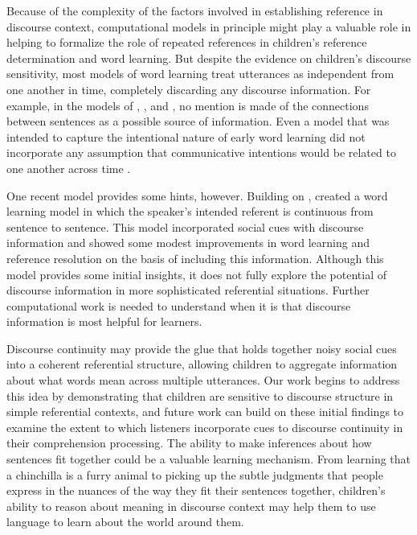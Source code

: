 \documentclass[man]{apa2}
\begin{document}
Because of the complexity of the factors involved in establishing reference in discourse context, computational models in principle might play a valuable role in helping to formalize the role of repeated references in children's reference determination and word learning. But despite the evidence on children's discourse sensitivity, most models of word learning treat utterances as independent from one another in time, completely discarding any discourse information. For example, in the models of , , and , no mention is made of the connections between sentences as a possible source of information. Even a model that was intended to capture the intentional nature of early word learning did not incorporate any assumption that communicative intentions would be related to one another across time \cite{frank2009}. 

One recent model provides some hints, however. Building on ,  created a word learning model in which the speaker's intended referent is continuous from sentence to sentence. This model incorporated social cues with discourse information and showed some modest improvements in word learning and reference resolution on the basis of including this information. Although this model provides some initial insights, it does not fully explore the potential of discourse information in more sophisticated referential situations. Further computational work is needed to understand when it is that discourse information is most helpful for learners. 

Discourse continuity may provide the glue that holds together noisy social cues into a coherent referential structure, allowing children to aggregate information about what words mean across multiple utterances.  Our work begins to address this idea by demonstrating that children are sensitive to discourse structure in simple referential contexts, and future work can build on these initial findings to examine the extent to which listeners incorporate cues to discourse continuity in their comprehension processing.  The ability to make inferences about how sentences fit together could be a valuable learning mechanism. From learning that a chinchilla is a furry animal to picking up the subtle judgments that people express in the nuances of the way they fit their sentences together, children's ability to reason about meaning in discourse context may help them to use language to learn about the world around them. 
\end{document}
